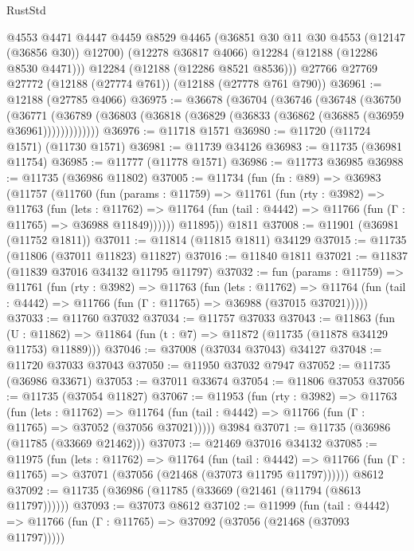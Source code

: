 \begin{lexlean}{RustStd}
\begin{coremodule}
        @4553
        @4471
        @4447
        @4459
        @8529
        @4465
        (@36851 @30 @11 @30 @4553 (@12147 (@36856 @30)) @12700)
        (@12278 @36817 @4066)
        @12284
        (@12188 (@12286 @8530 @4471)))
      @12284
      (@12188 (@12286 @8521 @8536)))
    @27766
    @27769
    @27772
    (@12188 (@27774 @761))
    (@12188 (@27778 @761 @790))
@36961 := @12188 (@27785 @4066)
@36975 := @36678
    (@36704
      (@36746
        (@36748
          (@36750
            (@36771
              (@36789 (@36803 (@36818 (@36829 (@36833 (@36862 (@36885 (@36959 @36961)))))))))))))
@36976 := @11718 @1571
@36980 := @11720 (@11724 @1571) (@11730 @1571)
@36981 := @11739 @34126
@36983 := @11735 (@36981 @11754)
@36985 := @11777 (@11778 @1571)
@36986 := @11773 @36985
@36988 := @11735 (@36986 @11802)
@37005 := @11734
    (fun (fn : @89) =>
    @36983
      (@11757
        (@11760
          (fun (params : @11759) =>
          @11761
            (fun (rty : @3982) =>
            @11763
              (fun (lets : @11762) =>
              @11764 (fun (tail : @4442) => @11766 (fun (Γ : @11765) => @36988 @11849))))))
        @11895))
    @1811
@37008 := @11901 (@36981 (@11752 @1811))
@37011 := @11814 (@11815 @1811) @34129
@37015 := @11735 (@11806 (@37011 @11823) @11827)
@37016 := @11840 @1811
@37021 := @11837 (@11839 @37016 @34132 @11795 @11797)
@37032 := fun (params : @11759) =>
  @11761
    (fun (rty : @3982) =>
    @11763
      (fun (lets : @11762) =>
      @11764 (fun (tail : @4442) => @11766 (fun (Γ : @11765) => @36988 (@37015 @37021)))))
@37033 := @11760 @37032
@37034 := @11757 @37033
@37043 := @11863
    (fun (U : @11862) => @11864 (fun (t : @7) => @11872 (@11735 (@11878 @34129 @11753) @11889)))
@37046 := @37008 (@37034 @37043) @34127
@37048 := @11720 @37033 @37043
@37050 := @11950 @37032 @7947
@37052 := @11735 (@36986 @33671)
@37053 := @37011 @33674
@37054 := @11806 @37053
@37056 := @11735 (@37054 @11827)
@37067 := @11953
    (fun (rty : @3982) =>
    @11763
      (fun (lets : @11762) =>
      @11764 (fun (tail : @4442) => @11766 (fun (Γ : @11765) => @37052 (@37056 @37021)))))
    @3984
@37071 := @11735 (@36986 (@11785 (@33669 @21462)))
@37073 := @21469 @37016 @34132
@37085 := @11975
    (fun (lets : @11762) =>
    @11764
      (fun (tail : @4442) =>
      @11766 (fun (Γ : @11765) => @37071 (@37056 (@21468 (@37073 @11795 @11797))))))
    @8612
@37092 := @11735 (@36986 (@11785 (@33669 (@21461 (@11794 (@8613 @11797))))))
@37093 := @37073 @8612
@37102 := @11999
    (fun (tail : @4442) => @11766 (fun (Γ : @11765) => @37092 (@37056 (@21468 (@37093 @11797)))))

\end{coremodule}
\end{lexlean}
